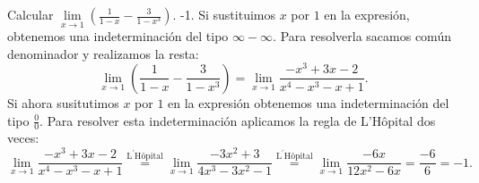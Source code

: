 {Calcular $\displaystyle \lim\limits_{x\rightarrow 1}\left(\frac{1}{1-x}-\frac{3}{1-x^{3}}\right)$.
}
{-1.
}
{Si sustituimos $x$ por $1$ en la expresión, obtenemos una indeterminación del tipo $\infty -\infty .$ Para resolverla sacamos común denominador y realizamos la resta: 
\[
\lim\limits_{x\rightarrow 1}\left( \frac{1}{1-x}-\frac{3}{1-x^{3}}\right) = \lim\limits_{x\rightarrow 1}\frac{-x^{3}+3x-2}{x^{4}-x^{3}-x+1}.
\]
Si ahora susitutimos $x$ por $1$ en la expresión obtenemos una indeterminación del tipo $\frac{0}{0}$. Para resolver esta indeterminación aplicamos la regla de L'Hôpital dos veces: 
\[
\lim\limits_{x\rightarrow 1}\frac{-x^{3}+3x-2}{x^{4}-x^{3}-x+1} \stackrel{\text{L}^{\prime }\text{H\^{o}pital}}{=} \lim\limits_{x\rightarrow 1}\frac{-3x^{2}+3}{4x^{3}-3x^{2}-1} \stackrel{\text{L}^{\prime }\text{Hôpital}}{=} \lim\limits_{x\rightarrow 1}\frac{-6x}{12x^{2}-6x}=\frac{-6}{6}=-1.
\]
}